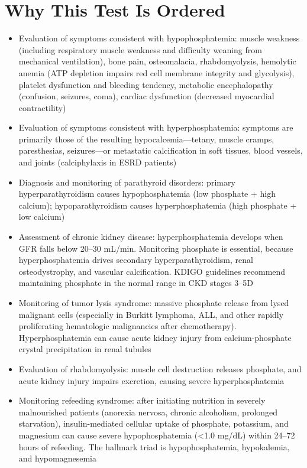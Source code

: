 \section*{Why This Test Is Ordered}
\begin{itemize}
  \item Evaluation of symptoms consistent with hypophosphatemia: muscle weakness (including respiratory muscle weakness and difficulty weaning from mechanical ventilation), bone pain, osteomalacia, rhabdomyolysis, hemolytic anemia (ATP depletion impairs red cell membrane integrity and glycolysis), platelet dysfunction and bleeding tendency, metabolic encephalopathy (confusion, seizures, coma), cardiac dysfunction (decreased myocardial contractility)
  \item Evaluation of symptoms consistent with hyperphosphatemia: symptoms are primarily those of the resulting hypocalcemia---tetany, muscle cramps, paresthesias, seizures---or metastatic calcification in soft tissues, blood vessels, and joints (calciphylaxis in ESRD patients)
  \item Diagnosis and monitoring of parathyroid disorders: primary hyperparathyroidism causes hypophosphatemia (low phosphate + high calcium); hypoparathyroidism causes hyperphosphatemia (high phosphate + low calcium)
  \item Assessment of chronic kidney disease: hyperphosphatemia develops when GFR falls below 20--30 mL/min. Monitoring phosphate is essential, because hyperphosphatemia drives secondary hyperparathyroidism, renal osteodystrophy, and vascular calcification. KDIGO guidelines recommend maintaining phosphate in the normal range in CKD stages 3--5D
  \item Monitoring of tumor lysis syndrome: massive phosphate release from lysed malignant cells (especially in Burkitt lymphoma, ALL, and other rapidly proliferating hematologic malignancies after chemotherapy). Hyperphosphatemia can cause acute kidney injury from calcium-phosphate crystal precipitation in renal tubules
  \item Evaluation of rhabdomyolysis: muscle cell destruction releases phosphate, and acute kidney injury impairs excretion, causing severe hyperphosphatemia
  \item Monitoring refeeding syndrome: after initiating nutrition in severely malnourished patients (anorexia nervosa, chronic alcoholism, prolonged starvation), insulin-mediated cellular uptake of phosphate, potassium, and magnesium can cause severe hypophosphatemia (<1.0 mg/dL) within 24--72 hours of refeeding. The hallmark triad is hypophosphatemia, hypokalemia, and hypomagnesemia

\end{itemize}
